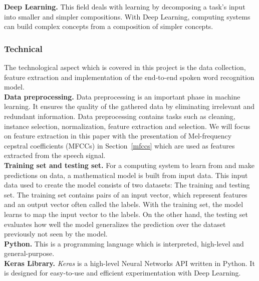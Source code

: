 \textbf{Deep Learning.} This field deals with learning by decomposing a task's
input into smaller and simpler compositions. With Deep Learning, computing
systems can build complex concepts from a composition of simpler concepts.

\subsubsection{Technical} The technological aspect which is covered in this
project is the data collection, feature extraction and implementation of the
end-to-end spoken word recognition model. \\

\textbf{Data preprocessing.} Data preprocessing is an important phase in machine
learning. It ensures the quality of the gathered data by eliminating irrelevant
and redundant information. Data preprocessing contains tasks such as cleaning,
instance selection, normalization, feature extraction and selection. We will
focus on feature extraction in this paper with the presentation of Mel-frequency
cepstral coefficients (MFCCs) in Section~\ref{mfccs} which are used as features
extracted from the speech signal.\\


\textbf{Training set and testing set.} For a computing system to learn from and
make predictions on data, a mathematical model is built from input data. This
input data used to create the model consists of two datasets: The training and
testing set. The training set contains pairs of an input vector, which represent
features and an output vector often called the labels. With the training set,
the model learns to map the input vector to the labels. On the other hand, the
testing set evaluates how well the model generalizes the prediction over the
dataset previously not seen by the model.\\

\textbf{Python.} This is a programming language which is interpreted, high-level
and general-purpose.~\cite{Python}\\

\textbf{Keras Library.} \textit{Keras} is a high-level Neural Networks API
written in Python. It is designed for easy-to-use and efficient experimentation
with Deep Learning.~\cite{chollet2015keras}
